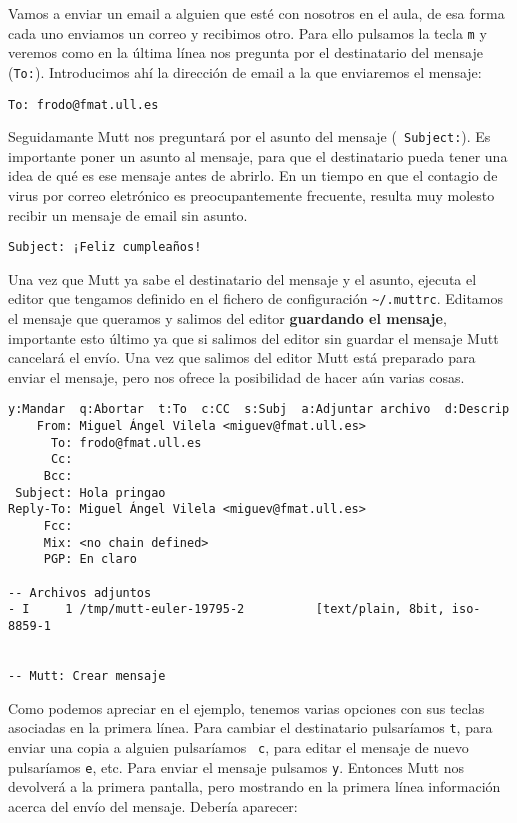 Vamos a enviar un email a alguien que esté con nosotros en el aula, de
esa forma  cada uno  enviamos un  correo y  recibimos otro.  Para ello
pulsamos  la tecla  {\tt m}  y  veremos como  en la  última línea  nos
pregunta por el destinatario del mensaje ({\tt To:}). Introducimos ahí
la dirección de email a la que enviaremos el mensaje:

\begin{verbatim}
To: frodo@fmat.ull.es
\end{verbatim}

Seguidamante {\sf Mutt} nos preguntará por el asunto del mensaje ({\tt
Subject:}).  Es importante  poner un  asunto al  mensaje, para  que el
destinatario  pueda tener  una idea  de qué  es ese  mensaje antes  de
abrirlo.  En  un  tiempo  en  que el  contagio  de  virus  por  correo
eletrónico es preocupantemente frecuente,  resulta muy molesto recibir
un mensaje de email sin asunto.

\begin{verbatim}
Subject: ¡Feliz cumpleaños!
\end{verbatim}

Una  vez que  {\sf Mutt}  ya  sabe el  destinatario del  mensaje y  el
asunto,  ejecuta el  editor que  tengamos  definido en  el fichero  de
configuración {\tt  \~{}/.muttrc}. Editamos el mensaje  que queramos y
salimos del editor {\bf guardando  el mensaje}, importante esto último
ya  que si  salimos  del  editor sin  guardar  el  mensaje {\sf  Mutt}
cancelará el  envío. Una vez  que salimos  del editor {\sf  Mutt} está
preparado para  enviar el mensaje,  pero nos ofrece la  posibilidad de
hacer aún varias cosas.


\begin{verbatim}
y:Mandar  q:Abortar  t:To  c:CC  s:Subj  a:Adjuntar archivo  d:Descrip
    From: Miguel Ángel Vilela <miguev@fmat.ull.es>
      To: frodo@fmat.ull.es
      Cc:
     Bcc:
 Subject: Hola pringao
Reply-To: Miguel Ángel Vilela <miguev@fmat.ull.es>
     Fcc:
     Mix: <no chain defined>
     PGP: En claro

-- Archivos adjuntos
- I     1 /tmp/mutt-euler-19795-2          [text/plain, 8bit, iso-8859-1


-- Mutt: Crear mensaje
\end{verbatim}

Como podemos apreciar  en el ejemplo, tenemos varias  opciones con sus
teclas asociadas  en la  primera línea.  Para cambiar  el destinatario
pulsaríamos {\tt t}, para enviar  una copia a alguien pulsaríamos {\tt
c}, para  editar el mensaje  de nuevo  pulsaríamos {\tt e},  etc. Para
enviar el mensaje pulsamos {\tt  y}. Entonces {\sf Mutt} nos devolverá
a la primera pantalla, pero  mostrando en la primera línea información
acerca del envío del mensaje. Debería aparecer:

